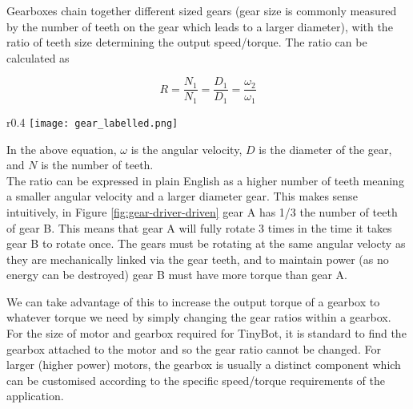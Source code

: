 \documentclass[../TinyBot.tex]{subfiles}
\begin{document}
Gearboxes chain together different sized gears (gear size is commonly measured by the number of teeth on the gear which leads to a larger diameter), with the ratio of teeth size determining the output speed/torque. The ratio can be calculated as 


    
\[ R = \frac{N_1}{N_1} = \frac{D_1}{D_1} = \frac{\omega_2}{\omega_1} \]
\bigskip

\begin{wrapfigure}{r}{0.4\textwidth}
    \texttt{[image: gear\_labelled.png]}
        \label{fig:gear-driver-driven}
\end{wrapfigure}

In the above equation, $\omega$ is the angular velocity, $D$ is the diameter of the gear, and $N$ is the number of teeth. \\

The ratio can be expressed in plain English as a higher number of teeth meaning a smaller angular velocity and a larger diameter gear. This makes sense intuitively, in Figure \ref{fig:gear-driver-driven} gear A has 1/3 the number of teeth of gear B. This means that gear A will fully rotate 3 times in the time it takes gear B to rotate once. The gears must be rotating at the same angular velocty as they are mechanically linked via the gear teeth, and to maintain power (as no energy can be destroyed) gear B must have more torque than gear A. 


\bigskip

We can take advantage of this to increase the output torque of a gearbox to whatever torque we need by simply changing the gear ratios within a gearbox. For the size of motor and gearbox required for TinyBot, it is standard to find the gearbox attached to the motor and so the gear ratio cannot be changed. For larger (higher power) motors, the gearbox is usually a distinct component which can be customised according to the specific speed/torque requirements of the application. \\
\end{document}
